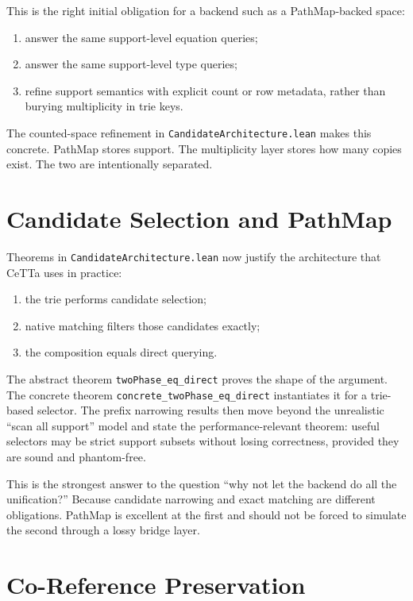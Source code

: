\documentclass[11pt]{article}
\newcommand{\code}[1]{\texttt{#1}}
\newcommand{\CeTTa}{\textup{CeTTa}}
\newcommand{\PathMap}{\textup{PathMap}}
\begin{document}
This is the right initial obligation for a backend such as a
\PathMap{}-backed space:
\begin{enumerate}
\item answer the same support-level equation queries;
\item answer the same support-level type queries;
\item refine support semantics with explicit count or row metadata, rather
  than burying multiplicity in trie keys.
\end{enumerate}

The counted-space refinement in
\code{CandidateArchitecture.lean} makes this concrete.  \PathMap{} stores
support.  The multiplicity layer stores how many copies exist.  The two
are intentionally separated.

\section{Candidate Selection and \PathMap{}}

Theorems in \code{CandidateArchitecture.lean} now justify the architecture
that \CeTTa{} uses in practice:
\begin{enumerate}
\item the trie performs candidate selection;
\item native matching filters those candidates exactly;
\item the composition equals direct querying.
\end{enumerate}

The abstract theorem \code{twoPhase\_eq\_direct} proves the shape of the
argument.  The concrete theorem \code{concrete\_twoPhase\_eq\_direct}
instantiates it for a trie-based selector.  The prefix narrowing results
then move beyond the unrealistic ``scan all support'' model and state the
performance-relevant theorem: useful selectors may be strict support
subsets without losing correctness, provided they are sound and
phantom-free.

This is the strongest answer to the question ``why not let the backend do
all the unification?''  Because candidate narrowing and exact matching are
different obligations.  \PathMap{} is excellent at the first and should
not be forced to simulate the second through a lossy bridge layer.

\section{Co-Reference Preservation}
\end{document}
